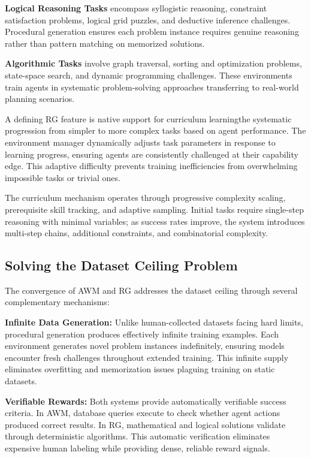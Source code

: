 \textbf{Logical Reasoning Tasks} encompass syllogistic reasoning, constraint satisfaction problems, logical grid puzzles, and deductive inference challenges. Procedural generation ensures each problem instance requires genuine reasoning rather than pattern matching on memorized solutions.

\textbf{Algorithmic Tasks} involve graph traversal, sorting and optimization problems, state-space search, and dynamic programming challenges. These environments train agents in systematic problem-solving approaches transferring to real-world planning scenarios.

A defining RG feature is native support for curriculum learningthe systematic progression from simpler to more complex tasks based on agent performance. The environment manager dynamically adjusts task parameters in response to learning progress, ensuring agents are consistently challenged at their capability edge. This adaptive difficulty prevents training inefficiencies from overwhelming impossible tasks or trivial ones.

The curriculum mechanism operates through progressive complexity scaling, prerequisite skill tracking, and adaptive sampling. Initial tasks require single-step reasoning with minimal variables; as success rates improve, the system introduces multi-step chains, additional constraints, and combinatorial complexity.

\subsection{Solving the Dataset Ceiling Problem}

The convergence of AWM and RG addresses the dataset ceiling through several complementary mechanisms:

\textbf{Infinite Data Generation:} Unlike human-collected datasets facing hard limits, procedural generation produces effectively infinite training examples. Each environment generates novel problem instances indefinitely, ensuring models encounter fresh challenges throughout extended training. This infinite supply eliminates overfitting and memorization issues plaguing training on static datasets.

\textbf{Verifiable Rewards:} Both systems provide automatically verifiable success criteria. In AWM, database queries execute to check whether agent actions produced correct results. In RG, mathematical and logical solutions validate through deterministic algorithms. This automatic verification eliminates expensive human labeling while providing dense, reliable reward signals.

